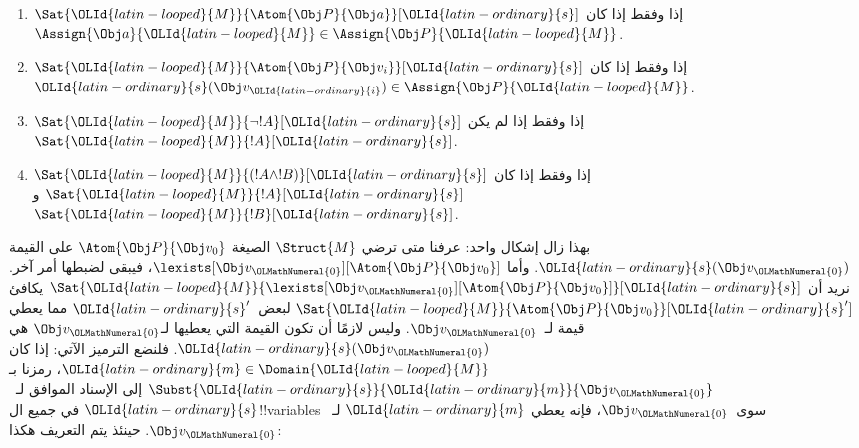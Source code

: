 \documentclass[../../../include/open-logic-section]{subfiles}
\begin{document}
\begin{enumerate}
  \item $\Sat{\OLId{latin-looped}{M}}{\Atom{\Obj P}{\Obj a}}[\OLId{latin-ordinary}{s}]$ إذا وفقط إذا كان
  $\Assign{\Obj a}{\OLId{latin-looped}{M}} \in \Assign{\Obj P}{\OLId{latin-looped}{M}}$.
  \item $\Sat{\OLId{latin-looped}{M}}{\Atom{\Obj P}{\Obj v_i}}[\OLId{latin-ordinary}{s}]$ إذا وفقط إذا كان
  $\OLId{latin-ordinary}{s}(\Obj v_\OLId{latin-ordinary}{i}) \in \Assign{\Obj P}{\OLId{latin-looped}{M}}$.
  \item $\Sat{\OLId{latin-looped}{M}}{\lnot !A}[\OLId{latin-ordinary}{s}]$ إذا وفقط إذا لم يكن
  $\Sat{\OLId{latin-looped}{M}}{!A}[\OLId{latin-ordinary}{s}]$.
  \item $\Sat{\OLId{latin-looped}{M}}{(!A \land !B)}[\OLId{latin-ordinary}{s}]$ إذا وفقط إذا كان
  $\Sat{\OLId{latin-looped}{M}}{!A}[\OLId{latin-ordinary}{s}]$ و$\Sat{\OLId{latin-looped}{M}}{!B}[\OLId{latin-ordinary}{s}]$.
\end{enumerate}
بهذا زال إشكال واحد: عرفنا متى ترضي $\Struct{M}$
الصيغة $\Atom{\Obj P}{\Obj v_0}$ على القيمة $\OLId{latin-ordinary}{s}(\Obj v_\OLMathNumeral{0})$.
وأما $\lexists[\Obj v_\OLMathNumeral{0}][\Atom{\Obj P}{\Obj v_0}]$، فيبقى
لضبطها أمر آخر. نريد أن
$\Sat{\OLId{latin-looped}{M}}{\lexists[\Obj v_\OLMathNumeral{0}][\Atom{\Obj P}{\Obj v_0}]}[\OLId{latin-ordinary}{s}]$
يكافئ $\Sat{\OLId{latin-looped}{M}}{\Atom{\Obj P}{\Obj v_0}}[\OLId{latin-ordinary}{s}']$ لبعض~$\OLId{latin-ordinary}{s}'$
مما يعطي قيمة لـ~$\Obj v_\OLMathNumeral{0}$. وليس لازمًا أن تكون القيمة التي
يعطيها لـ$\Obj v_\OLMathNumeral{0}$ هي $\OLId{latin-ordinary}{s}(\Obj v_\OLMathNumeral{0})$. فلنضع الترميز الآتي:
إذا كان $\OLId{latin-ordinary}{m} \in \Domain{\OLId{latin-looped}{M}}$، رمزنا بـ
$\Subst{\OLId{latin-ordinary}{s}}{\OLId{latin-ordinary}{m}}{\Obj v_\OLMathNumeral{0}}$ إلى الإسناد الموافق لـ~$\OLId{latin-ordinary}{s}$ في جميع
ال!!{variable}s سوى~$\Obj v_\OLMathNumeral{0}$، فإنه يعطي $\OLId{latin-ordinary}{m}$ لـ~$\Obj v_\OLMathNumeral{0}$.
حينئذ يتم التعريف هكذا:
\end{document}
